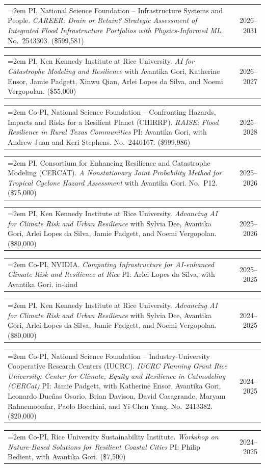 \documentclass[10pt,oneside]{article}
\makeatletter
\newenvironment{alignedentrieshang}[1][2em]{%
  \noindent%
}{%
}
\newcommand{\hangingitem}[2]{%
  \noindent%
  \begin{tabular*}{\textwidth}{@{}p{0.85\textwidth}@{\extracolsep{\fill}}r@{}}%
    \hangindent=2em \hangafter=1 #1 & #2%
  \end{tabular*}%
}
\makeatother
\begin{document}
\begin{alignedentrieshang}


\hangingitem{PI, National Science Foundation -- Infrastructure Systems and People. \textit{CAREER: Drain or Retain? Strategic Assessment of Integrated Flood Infrastructure Portfolios with Physics-Informed ML}. No.\ 2543303. (\$599,581)}{2026--2031}


\hangingitem{PI, Ken Kennedy Institute at Rice University. \textit{AI for Catastrophe Modeling and Resilience} with Avantika Gori, Katherine Ensor, Jamie Padgett, Xinwu Qian, Arlei Lopes da Silva, and Noemi Vergopolan. (\$55,000)}{2026--2027}


\hangingitem{Co-PI, National Science Foundation -- Confronting Hazards, Impacts and Risks for a Resilient Planet (CHIRRP). \textit{RAISE: Flood Resilience in Rural Texas Communities} PI: Avantika Gori, with Andrew Juan and Keri Stephens. No.\ 2440167. (\$999,986)}{2025--2028}


\hangingitem{PI, Consortium for Enhancing Resilience and Catastrophe Modeling (CERCAT). \textit{A Nonstationary Joint Probability Method for Tropical Cyclone Hazard Assessment} with Avantika Gori. No.\ P12. (\$75,000)}{2025--2026}


\hangingitem{PI, Ken Kennedy Institute at Rice University. \textit{Advancing AI for Climate Risk and Urban Resilience} with Sylvia Dee, Avantika Gori, Arlei Lopes da Silva, Jamie Padgett, and Noemi Vergopolan. (\$80,000)}{2025--2026}


\hangingitem{Co-PI, NVIDIA. \textit{Computing Infrastructure for AI-enhanced Climate Risk and Resilience at Rice} PI: Arlei Lopes da Silva, with Avantika Gori. in-kind}{2025--2025}


\hangingitem{PI, Ken Kennedy Institute at Rice University. \textit{Advancing AI for Climate Risk and Urban Resilience} with Sylvia Dee, Avantika Gori, Arlei Lopes da Silva, Jamie Padgett, and Noemi Vergopolan. (\$80,000)}{2024--2025}


\hangingitem{Co-PI, National Science Foundation -- Industry-University Cooperative Research Centers (IUCRC). \textit{IUCRC Planning Grant Rice University: Center for Climate, Equity and Resilience in Catmodeling (CERCat)} PI: Jamie Padgett, with Katherine Ensor, Avantika Gori, Leonardo Dueñas Osorio, Brian Davison, David Casagrande, Maryam Rahnemoonfar, Paolo Bocchini, and Yi-Chen Yang. No.\ 2413382. (\$20,000)}{2024--2025}


\hangingitem{Co-PI, Rice University Sustainability Institute. \textit{Workshop on Nature-Based Solutions for Resilient Coastal Cities} PI: Philip Bedient, with Avantika Gori. (\$7,500)}{2024--2025}



\end{alignedentrieshang}
\end{document}
